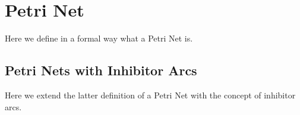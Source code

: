 \section{Petri Net}

Here we define in a formal way what a Petri Net is.

\subsection{Petri Nets with Inhibitor Arcs}

Here we extend the latter definition of a Petri Net with the concept of inhibitor arcs.
